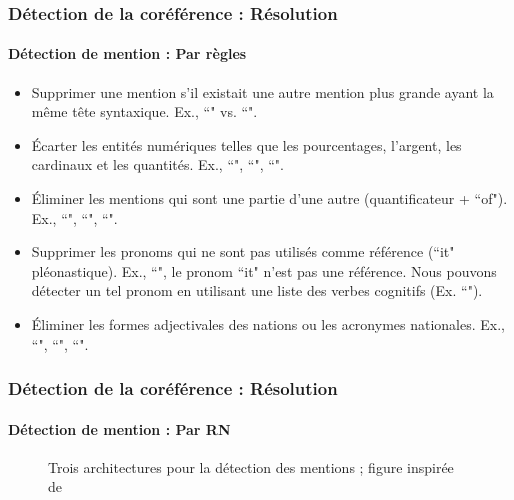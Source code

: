 \documentclass[xcolor=table]{beamer}
\begin{document}
\begin{frame}
	\frametitle{Détection de la coréférence : Résolution}
	\framesubtitle{Détection de mention : Par règles \cite{2013-lee-al}}
	
	\begin{itemize}
		\item Supprimer une mention s'il existait une autre mention plus grande ayant la même tête syntaxique. 
		Ex., ``" vs. ``". 
		
		\item Écarter les entités numériques telles que les pourcentages, l'argent, les cardinaux et les quantités. 
		Ex., ``", ``", ``".
		
		\item Éliminer les mentions qui sont une partie d'une autre (quantificateur + ``of"). 
		Ex., ``", ``", ``".
		
		\item Supprimer les pronoms qui ne sont pas utilisés comme référence (``it" pléonastique). 
		Ex., ``", le pronom ``it" n'est pas une référence. 
		Nous pouvons détecter un tel pronom en utilisant une liste des verbes cognitifs (Ex. ``").
		
		\item Éliminer les formes adjectivales des nations ou les acronymes nationales.
		Ex., ``", ``", ``".
		
	\end{itemize}
	
\end{frame}


\begin{frame}
	\frametitle{Détection de la coréférence : Résolution}
	\framesubtitle{Détection de mention : Par RN \cite{2020-yu-al}}
	
	\begin{figure}[ht]
		\centering
		\caption[Trois architectures pour la détection des mentions]{Trois architectures pour la détection des mentions ; figure inspirée de \cite{2020-yu-al}}
		\label{fig:det-mention-yu}
	\end{figure}
	
\end{frame}
\end{document}
